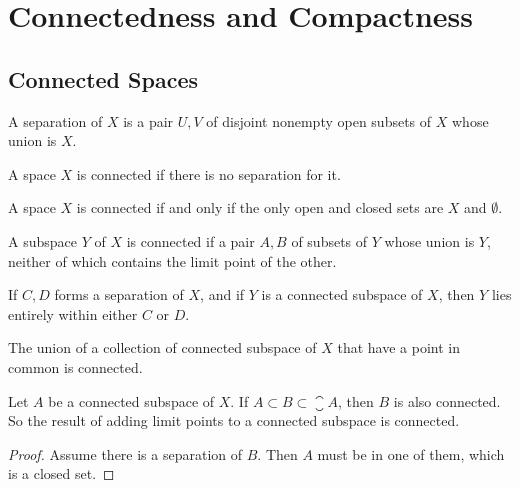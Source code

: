 \section{Connectedness and Compactness}

\subsection{Connected Spaces}

\begin{definition}
    A separation of $X$ is a pair $U,V$ of disjoint nonempty open subsets of $X$ whose union is $X$.
\end{definition}

\begin{definition}
    A space $X$ is connected if there is no separation for it.
\end{definition}

\begin{theorem}
    A space $X$ is connected if and only if the only open and closed sets are $X$ and $\emptyset$.
\end{theorem}

\begin{theorem}
    A subspace $Y$ of $X$ is connected if a pair $A,B$ of subsets of $Y$ whose union is $Y$, neither of which contains the limit point of the other.    
\end{theorem}

\begin{theorem}
    If $C,D$ forms a separation of $X$, and if $Y$ is a connected subspace of $X$, then $Y$ lies entirely within either $C$ or $D$.
\end{theorem}

\begin{theorem}
The union of a collection of connected subspace of $X$ that have a point in common is connected.    
\end{theorem}

\begin{theorem}
Let $A$ be a connected subspace of $X$. If $A \subset B \subset \closure{A}$, then $B$ is also connected. So the result of adding limit points to a connected subspace is connected.
\end{theorem}
\begin{proof}
    Assume there is a separation of $B$. Then $A$ must be in one of them, which is a closed set.
\end{proof}

